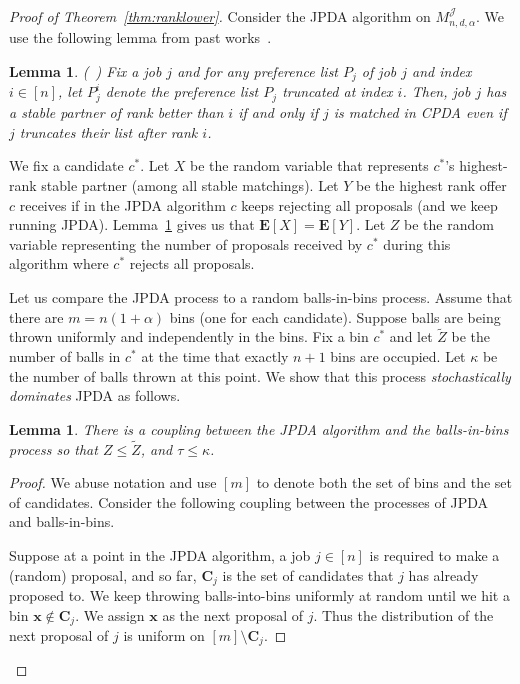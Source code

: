 \documentclass[11pt]{amsart}
\newtheorem{lemma}[theorem]{Lemma}
\begin{document}
\begin{proof}[Proof of Theorem~\ref{thm:ranklower}]
Consider the JPDA algorithm on $M_{n, d, \alpha}^{\mathcal{J}}$.  We use the following lemma from past works~\cite{cai2022short, immorlica2005marriage,knuth1976mariages}.

\begin{lemma}\label{lem:PDA*}(~\cite{cai2022short})
Fix a job $j$ and for any preference list $P_j$ of job $j$ and index $i \in [n]$, let $P_j^i$ denote the preference list $P_j$ truncated at index $i$.  Then, job $j$ has a stable partner of rank better
than $i$ if and only if $j$ is matched in CPDA even if $j$ truncates their list after rank $i$.
\end{lemma}



We fix a candidate $c^*$. Let $X$ be the random variable that represents $c^*$'s highest-rank stable partner (among all stable matchings). Let $Y$ be the highest rank offer $c$ receives if in the JPDA algorithm $c$ keeps rejecting all proposals (and we keep running JPDA). Lemma~\ref{lem:PDA*} gives us that $\mathbf{E}[X] = \mathbf{E}[Y]$. Let $Z$ be the random variable representing the number of proposals received by $c^*$ during this algorithm where $c^*$ rejects all proposals.

Let us compare the JPDA process to a random balls-in-bins process. Assume that there are $m = n(1 +\alpha)$ bins (one for each candidate). Suppose balls are being thrown uniformly and independently in the bins. Fix a bin $c^*$ and let $\tilde{Z}$ be the number of balls in $c^*$ at the time that exactly $n + 1$ bins are occupied. Let $\kappa$ be the number of balls thrown at this point. We show that this process {\em stochastically dominates} JPDA as follows.

\begin{lemma}
There is a coupling between the JPDA algorithm and the balls-in-bins process so that $Z \leq \tilde{Z}$, and $\tau \leq \kappa$.
\end{lemma}

\begin{proof}
We abuse notation and use $[m]$ to denote both the set of bins and the set of candidates. Consider the following coupling between the processes of JPDA and balls-in-bins.

Suppose at a point in the JPDA algorithm, a job $j \in [n]$ is required to make a (random) proposal, and so far, $\mathbf{C}_j$ is the set of candidates that $j$ has already proposed to. We keep throwing balls-into-bins uniformly at random until we hit a bin $\mathbf{x} \not\in \mathbf{C}_j$. We assign $\mathbf{x}$ as the next proposal of $j$. Thus the distribution of the next proposal of $j$ is uniform on $[m] \setminus \mathbf{C}_j$. 


\end{proof}
\end{proof}
\end{document}
